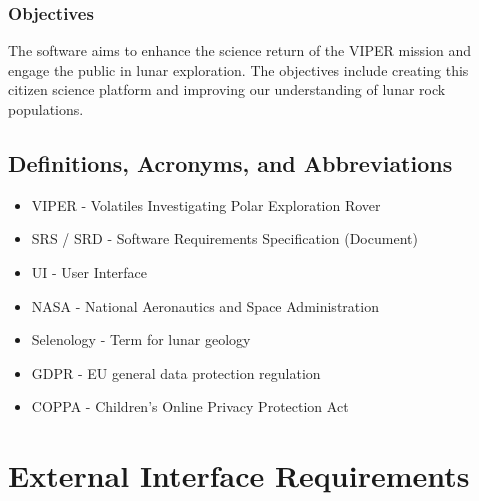 \documentclass{article}
\begin{document}
\subsubsection{Objectives}
The software aims to enhance the science return of the VIPER mission and engage the public in lunar exploration. The objectives include creating this citizen science platform and improving our understanding of lunar rock populations.

\subsection{Definitions, Acronyms, and Abbreviations}
\begin{itemize}
	\item VIPER - Volatiles Investigating Polar Exploration Rover
	\item SRS / SRD - Software Requirements Specification (Document)
	\item UI - User Interface
	\item NASA - National Aeronautics and Space Administration
	\item Selenology - Term for lunar geology
	\item GDPR - EU general data protection regulation
	\item COPPA - Children's Online Privacy Protection Act
\end{itemize}

\section{External Interface Requirements}
\end{document}
